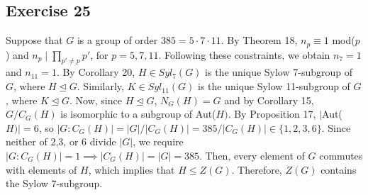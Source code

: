 \subsection*{Exercise 25}
Suppose that $G$ is a group of order $385 = 5\cdot7\cdot11$. By Theorem 18, $n_{p} \equiv 1$ mod($p$) and $n_{p} \mid \prod_{p'\not=p}p'$, for $p = 5,7,11$. Following these constraints, we obtain $n_7 = 1$ and $n_{11} = 1$. By Corollary 20, $H \in Syl_7(G)$ is the unique Sylow 7-subgroup of $G$, where $H \trianglelefteq G$. Similarly, $K \in Syl_{11}(G)$ is the unique Sylow 11-subgroup of $G$, where $K \trianglelefteq G$. Now, since $H \trianglelefteq G$, $N_G(H) = G$ and by Corollary 15, $G/C_G(H)$ is isomorphic to a subgroup of Aut($H)$. By Proposition 17, $|$Aut($H)| = 6$, so $|G:C_G(H)| = |G|/|C_G(H)| = 385/|C_G(H)| \in \{1,2,3,6\}.$ Since neither of 2,3, or 6 divide $|G|$, we require $|G:C_G(H)| = 1 \implies |C_G(H)| = |G| = 385$. Then, every element of $G$ commutes with elements of $H$, which implies that $H \le Z(G)$. Therefore, $Z(G)$ contains the Sylow 7-subgroup.